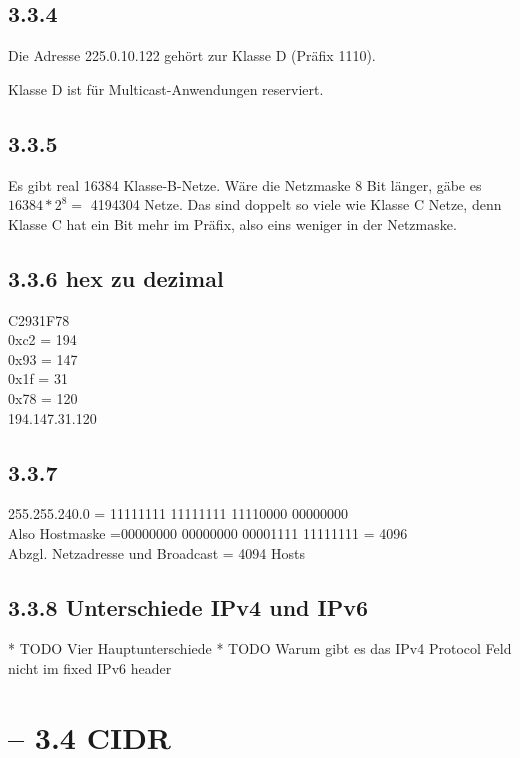 \documentclass[a4paper,
			llpt,
			solution,
			accentcolor=tud2d,
			colorbacktitle
			]
			{tudexercise}
\newcommand{\8}{$\infty$}
\begin{document}
\subsection{3.3.4}
Die Adresse 225.0.10.122 gehört zur Klasse D (Präfix 1110).

Klasse D ist für Multicast-Anwendungen reserviert.

\subsection{3.3.5}
Es gibt real 16384 Klasse-B-Netze. Wäre die Netzmaske 8 Bit länger, gäbe
es $16384*2^8 = $ 4194304  Netze. Das sind doppelt so viele wie Klasse C Netze,
denn Klasse C hat ein Bit mehr im Präfix, also eins weniger in der Netzmaske.

\subsection{3.3.6 hex zu dezimal}
C2931F78  \\
0xc2 = 194 \\
0x93 = 147 \\
0x1f = 31 \\
0x78 = 120 \\
194.147.31.120

\subsection{3.3.7}
255.255.240.0 = 11111111 11111111 11110000 00000000 \\
Also Hostmaske =00000000 00000000 00001111 11111111 = 4096 \\
Abzgl. Netzadresse und Broadcast = 4094 Hosts

\subsection{3.3.8 Unterschiede IPv4 und IPv6}
* TODO Vier Hauptunterschiede
* TODO Warum gibt es das IPv4 Protocol Feld nicht im fixed IPv6 header

\section{ -- 3.4 CIDR}
\end{document}
